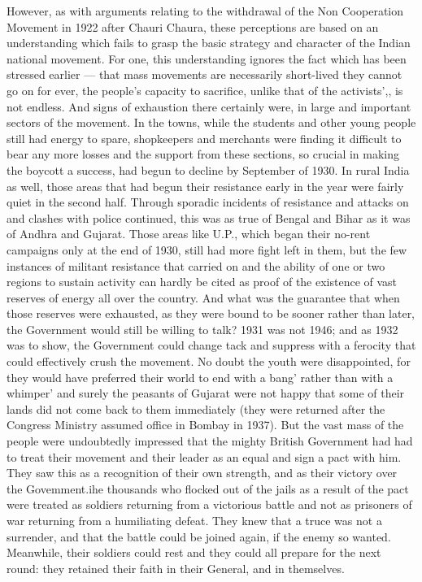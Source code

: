However, as with arguments relating to the withdrawal of the Non Cooperation Movement in 1922 after Chauri Chaura, these perceptions are based on an understanding which fails to grasp the basic strategy and character of the Indian national movement. For one, this understanding ignores the fact which has been stressed earlier — that mass movements are necessarily short-lived they cannot go on for ever, the people's capacity to sacrifice, unlike that of the activists',, is not endless. And signs of exhaustion there certainly were, in large and important sectors of the movement. In the towns, while the students and other young people still had energy to spare, shopkeepers and merchants were finding it difficult to bear any more losses and the support from these sections, so crucial in making the boycott a success, had begun to decline by September of 1930. In rural India as well, those areas that had begun their resistance early in the year were fairly quiet in the second half. Through sporadic incidents of resistance and attacks on and clashes with police continued, this was as true of Bengal and Bihar as it was of Andhra and Gujarat. Those areas like U.P., which began their no-rent campaigns only at the end of 1930, still had more fight left in them, but the few instances of militant resistance that carried on and the ability of one or two regions to sustain activity can hardly be cited as proof of the existence of vast reserves of energy all over the country. And what was the guarantee that when those reserves were exhausted, as they were bound to be sooner rather than later, the Government would still be willing to talk? 1931 was not 1946; and as 1932 was to show, the Government could change tack and suppress with a ferocity that could effectively crush the movement. No doubt the youth were disappointed, for they would have preferred their world to end with a bang' rather than with a whimper' and surely the peasants of Gujarat were not happy that some of their lands did not come back to them immediately (they were returned after the Congress Ministry assumed office in Bombay in 1937). But the vast mass of the people were undoubtedly impressed that the mighty British Government had had to treat their movement and their leader as an equal and sign a pact with him. They saw this as a recognition of their own strength, and as their victory over the Govemment.ihe thousands who flocked out of the jails as a result of the pact were treated as soldiers returning from a victorious battle and not as prisoners of war returning from a humiliating defeat. They knew that a truce was not a surrender, and that the battle could be joined again, if the enemy so wanted. Meanwhile, their soldiers could rest and they could all prepare for the next round: they retained their faith in their General, and in themselves.

